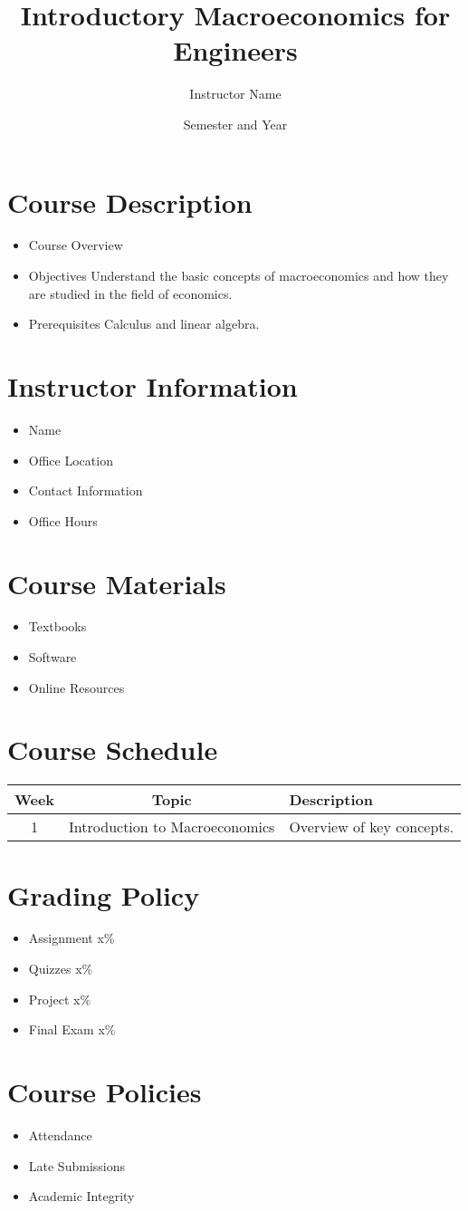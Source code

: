 \documentclass[11pt]{article}
\title{Introductory Macroeconomics for Engineers}
\author{Instructor Name}
\date{Semester and Year}
\begin{document}
\maketitle

\section*{Course Description}
\begin{itemize}
    \item Course Overview
    \item Objectives
    Understand the basic concepts of macroeconomics and how they are studied in the
    field of economics.
    \item Prerequisites
    Calculus and linear algebra.
\end{itemize}

\section*{Instructor Information}
\begin{itemize}
    \item Name
    \item Office Location
    \item Contact Information
    \item Office Hours
\end{itemize}

\section*{Course Materials}
\begin{itemize}
    \item Textbooks
    \item Software
    \item Online Resources
\end{itemize}

\section*{Course Schedule}
\begin{tabular}{|c|c|p{10cm}|}
\hline
Week & Topic & Description \\
\hline
1 & Introduction to Macroeconomics & Overview of key concepts. \\
\hline
\end{tabular}

\section*{Grading Policy}
\begin{itemize}
    \item Assignment x\% 
    \item Quizzes x\%
    \item Project x\%
    \item Final Exam x\%
\end{itemize}

\section*{Course Policies}
\begin{itemize}
    \item Attendance
    \item Late Submissions
    \item Academic Integrity
\end{itemize}
\end{document}
